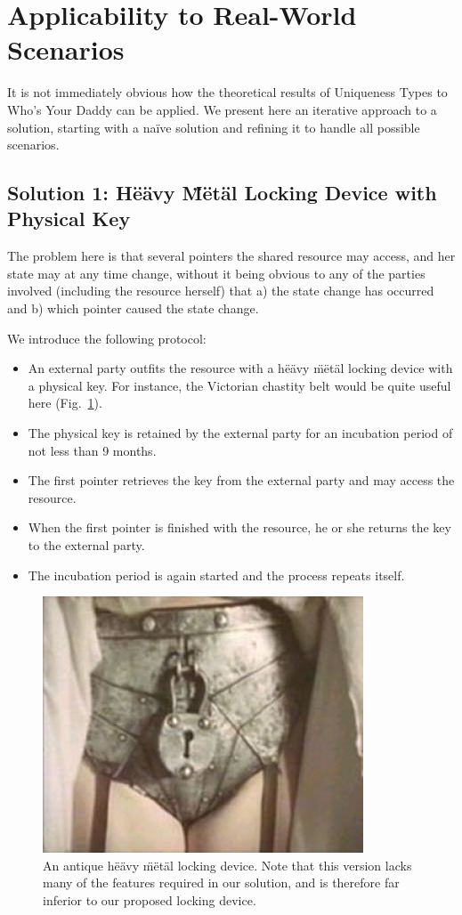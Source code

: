 \documentclass[nocopyrightspace,10pt]{sigplanconf}
\begin{document}
\section{Applicability to Real-World Scenarios}
It is not immediately obvious how the theoretical results of Uniqueness Types to Who's Your Daddy can be applied. We present here an iterative approach to a solution, starting with a na\"{i}ve solution and refining it to handle all possible scenarios.

\subsection{Solution 1: H\"{e}\"{a}vy \"{M}\"{e}t\"{a}l Locking Device with Physical Key}
The problem here is that several pointers the shared resource may access, and her state may at any time change, without it being obvious to any of the parties involved (including the resource herself) that a) the state change has occurred and b) which pointer caused the state change.

We introduce the following protocol:
\begin{itemize}
\item An external party outfits the resource with a h\"{e}\"{a}vy \"{m}\"{e}t\"{a}l locking device with a physical key. For instance, the Victorian chastity belt would be quite useful here (Fig.~\ref{fig:chastity}).
\item The physical key is retained by the external party for an incubation period of not less than 9 months.
\item The first pointer retrieves the key from the external party and may access the resource.
\item When the first pointer is finished with the resource, he or she returns the key to the external party.
\item The incubation period is again started and the process repeats itself.
\end{itemize}

\begin{figure}[tbh!]
\centering
\includegraphics[width=0.75\linewidth]{chastity-belt2.jpg}
\caption{An antique h\"{e}\"{a}vy \"{m}\"{e}t\"{a}l locking device. Note that this version lacks many of the features required in our solution, and is therefore far inferior to our proposed locking device.}
\label{fig:chastity}
\end{figure}
\end{document}
